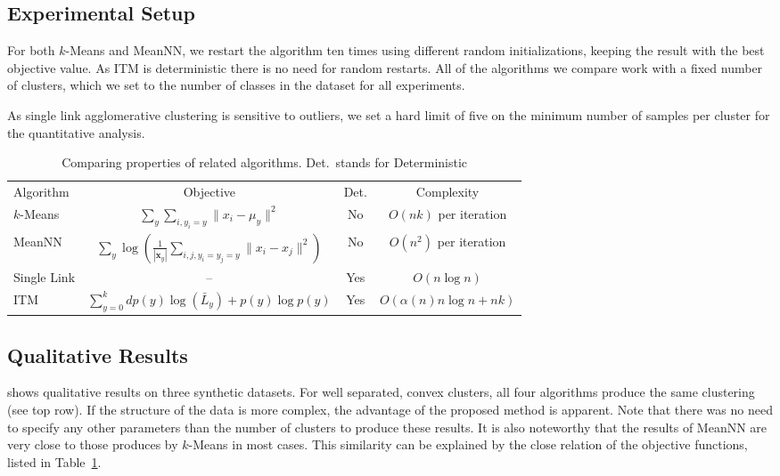 \subsection{Experimental Setup}
For both $k$-Means and MeanNN, we restart the algorithm ten times using
different random initializations, keeping the result with the best objective
value. As ITM is deterministic there is no need for random restarts.  All of
the algorithms we compare work with a fixed number of clusters, which we set to
the number of classes in the dataset for all experiments.

As single link agglomerative clustering is sensitive to outliers, we set
a hard limit of five on the minimum number of samples per cluster for
the quantitative analysis.

\begin{table}[t]
\centering
\begin{tabularx}{\linewidth}{@{\extracolsep{\fill}}lccc}
\toprule
Algorithm &     Objective &     Det.&      Complexity \\
\cmidrule{1-4}
$k$-Means &     $\displaystyle \sum_y \sum_{i, y_i = y} \| x_i - \mu_y \|^2$ & No  & $O(nk)$ per iteration%
\\
MeanNN &    $\displaystyle \sum_y \log\left(\frac{1}{|\mathbf{x}_y|}\sum_{i,j, y_i=y_j=y} \| x_i - x_j \|^2 \right)$ & No & $O(n^2)$ per iteration\\
Single Link &   -- &    Yes    &    $O(n\log n)$\\
ITM & $\displaystyle \sum_{y=0}^k d p(y) \log(\bar{L}_y  ) + p(y) \log{p(y)}$ & Yes & $O(\alpha(n) n \log n + nk)$\\
\bottomrule
\end{tabularx}
\caption{Comparing properties of related algorithms. Det.\ stands for Deterministic}\label{nowotab}
\end{table}


\subsection{Qualitative Results}
 shows qualitative results on three synthetic datasets.
For well separated, convex clusters, all four algorithms produce the same
clustering (see top row).  If the structure of the data is more complex, the
advantage of the proposed method is apparent.  Note that there was no need to
specify any other parameters than the number of clusters to produce these
results.  It is also noteworthy that the results of MeanNN are very close to
those produces by $k$-Means in most cases. This similarity can be explained
by the close relation of the objective functions, listed in Table~\ref{nowotab}.

